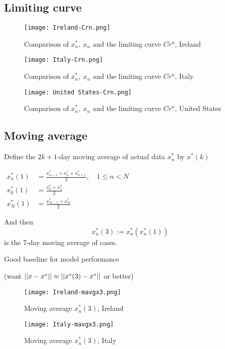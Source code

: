 \subsection{Limiting curve}

\begin{figure}[H]
\texttt{[image: Ireland-Crn.png]}
\endminipage 
\caption{Comparison of $x^*_n,\ x_n$ and the limiting curve $Cr^n$, Ireland}
\end{figure}

\begin{figure}[H]
\texttt{[image: Italy-Crn.png]}
\endminipage 
\caption{Comparison of $x^*_n,\ x_n$ and the limiting curve $Cr^n$, Italy}
\end{figure}

\begin{figure}[H]
\texttt{[image: United States-Crn.png]}
\endminipage 
\caption{Comparison of $x^*_n,\ x_n$ and the limiting curve $Cr^n$, United States}
\end{figure}

\subsection{Moving average}

Define the $2k+1$-day moving average of actual data $x_n^*$ by $x^*(k)$

$\begin{aligned}
x^*_n(1) &=\frac{x^*_{n-1} + x^*_n + x^*_{n+1}}{3},\quad 1\leq n < N \\
x^*_0(1) &=\frac{x^*_0 + x^*_1}{2}\\
x^*_N(1) &=\frac{x^*_{N-1} + x^*_N}{2}
\end{aligned}$

And then $$x_n^*(3):= x^*_n(x^*_n(1))$$ is the 7-day moving average of cases.

Good baseline for model performance 

(want $\left|\left|x-x^*\right|\right|\approx\left|\left|x^*(3)-x^*\right|\right|$ or better)

\begin{figure}[H]
\texttt{[image: Ireland-mavgx3.png]}
\endminipage 
\caption{Moving average $x^*_n (3)$, Ireland}
\end{figure}

\begin{figure}[H]
\texttt{[image: Italy-mavgx3.png]}
\endminipage 
\caption{Moving average $x^*_n (3)$, Italy}
\end{figure}

